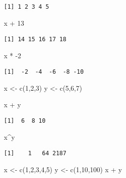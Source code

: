 \documentclass[
  letterpaper,
  DIV=11,
  numbers=noendperiod]{scrreprt}
\newenvironment{Shaded}{\begin{snugshade}}{\end{snugshade}}
\newcommand{\DecValTok}[1]{\textcolor[rgb]{0.68,0.00,0.00}{#1}}
\newcommand{\FunctionTok}[1]{\textcolor[rgb]{0.28,0.35,0.67}{#1}}
\newcommand{\NormalTok}[1]{\textcolor[rgb]{0.00,0.23,0.31}{#1}}
\newcommand{\OtherTok}[1]{\textcolor[rgb]{0.00,0.23,0.31}{#1}}
\newcommand{\SpecialCharTok}[1]{\textcolor[rgb]{0.37,0.37,0.37}{#1}}
\begin{document}
\begin{verbatim}
[1] 1 2 3 4 5
\end{verbatim}

\begin{Shaded}
\begin{Highlighting}[]
\NormalTok{x }\SpecialCharTok{+} \DecValTok{13}
\end{Highlighting}
\end{Shaded}

\begin{verbatim}
[1] 14 15 16 17 18
\end{verbatim}

\begin{Shaded}
\begin{Highlighting}[]
\NormalTok{x }\SpecialCharTok{*} \SpecialCharTok{{-}}\DecValTok{2}
\end{Highlighting}
\end{Shaded}

\begin{verbatim}
[1]  -2  -4  -6  -8 -10
\end{verbatim}

\begin{Shaded}
\begin{Highlighting}[]
\NormalTok{x }\OtherTok{\textless{}{-}} \FunctionTok{c}\NormalTok{(}\DecValTok{1}\NormalTok{,}\DecValTok{2}\NormalTok{,}\DecValTok{3}\NormalTok{)}
\NormalTok{y }\OtherTok{\textless{}{-}} \FunctionTok{c}\NormalTok{(}\DecValTok{5}\NormalTok{,}\DecValTok{6}\NormalTok{,}\DecValTok{7}\NormalTok{)}

\NormalTok{x }\SpecialCharTok{+}\NormalTok{ y}
\end{Highlighting}
\end{Shaded}

\begin{verbatim}
[1]  6  8 10
\end{verbatim}

\begin{Shaded}
\begin{Highlighting}[]
\NormalTok{x}\SpecialCharTok{\^{}}\NormalTok{y}
\end{Highlighting}
\end{Shaded}

\begin{verbatim}
[1]    1   64 2187
\end{verbatim}

\begin{Shaded}
\begin{Highlighting}[]
\NormalTok{x }\OtherTok{\textless{}{-}} \FunctionTok{c}\NormalTok{(}\DecValTok{1}\NormalTok{,}\DecValTok{2}\NormalTok{,}\DecValTok{3}\NormalTok{,}\DecValTok{4}\NormalTok{,}\DecValTok{5}\NormalTok{)}
\NormalTok{y }\OtherTok{\textless{}{-}} \FunctionTok{c}\NormalTok{(}\DecValTok{1}\NormalTok{,}\DecValTok{10}\NormalTok{,}\DecValTok{100}\NormalTok{)}
\NormalTok{x }\SpecialCharTok{+}\NormalTok{ y}
\end{Highlighting}
\end{Shaded}
\end{document}
